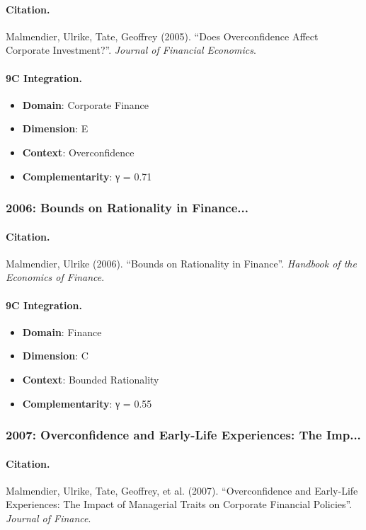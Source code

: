 \paragraph{Citation.}
Malmendier, Ulrike, Tate, Geoffrey (2005). ``Does Overconfidence Affect Corporate Investment?''. \textit{Journal of Financial Economics}.

\paragraph{9C Integration.}
\begin{itemize}[nosep]
  \item \textbf{Domain}: Corporate Finance
  \item \textbf{Dimension}: E
  \item \textbf{Context}: Overconfidence
  \item \textbf{Complementarity}: γ = 0.71
\end{itemize}


\subsubsection{2006: Bounds on Rationality in Finance...}

\paragraph{Citation.}
Malmendier, Ulrike (2006). ``Bounds on Rationality in Finance''. \textit{Handbook of the Economics of Finance}.

\paragraph{9C Integration.}
\begin{itemize}[nosep]
  \item \textbf{Domain}: Finance
  \item \textbf{Dimension}: C
  \item \textbf{Context}: Bounded Rationality
  \item \textbf{Complementarity}: γ = 0.55
\end{itemize}


\subsubsection{2007: Overconfidence and Early-Life Experiences: The Imp...}

\paragraph{Citation.}
Malmendier, Ulrike, Tate, Geoffrey, et al. (2007). ``Overconfidence and Early-Life Experiences: The Impact of Managerial Traits on Corporate Financial Policies''. \textit{Journal of Finance}.

